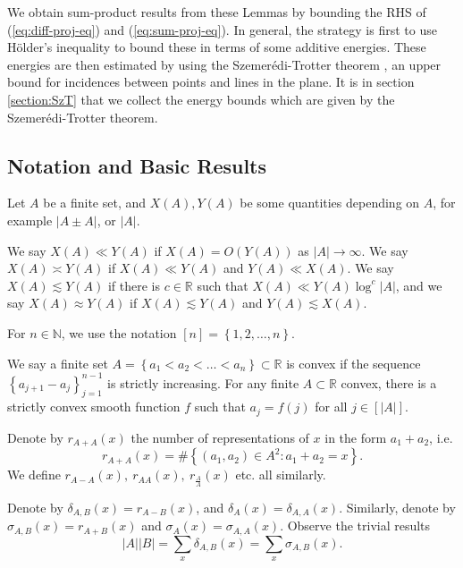 \documentclass[reqno]{amsart}
\newcommand{\szemeredi}{Szemer{\'e}di}
\newcommand{\holder}{H\"older}
\numberwithin{equation}{section}
\begin{document}
We obtain sum-product results from these Lemmas by bounding the RHS of 
(\ref{eq:diff-proj-eq}) and (\ref{eq:sum-proj-eq}). 
In general, the strategy is first to use \holder's inequality to
bound these in terms of some additive energies.
These energies are then estimated by using the \szemeredi-Trotter theorem \cite{SzT-original}, an upper
bound for incidences between points and lines in the plane. It is in section \ref{section:SzT}
that we collect the energy bounds which are given by the \szemeredi-Trotter theorem.

\bigskip

\subsection*{Notation and Basic Results}
Let \(A\) be a finite set, and \(X(A),Y(A)\) be some quantities depending on \(A\), for example \(\left\lvert A\pm A \right\rvert \), or \(\left\lvert A \right\rvert \).

We say \(X(A) \ll Y(A)\) if \(X(A) = O(Y(A))\) as \(\left\lvert A \right\rvert \to \infty  \).
We say \(X(A) \asymp Y(A)\) if \(X(A) \ll Y(A)\) and \(Y(A) \ll X(A)\). We say \(X(A) \lesssim Y(A)\) if
there is \(c \in \mathbb{R} \) such that \(X(A) \ll Y(A) \log ^{c}\left\lvert A \right\rvert \), and we say
\(X(A) \approx Y(A)\) if \(X(A)\lesssim Y(A)\) and \(Y(A) \lesssim X(A)\).

For \(n \in \mathbb{N} \), we use the notation \([n] = \left\{ 1,2, \ldots , n \right\} \).

We say a finite set \(A = \left\{ a_1 < a_2 < \ldots < a_{n}  \right\} \subset \mathbb{R}  \) is convex
if the sequence \(\left\{ a_{j+1} - a_{j}  \right\} _{j=1} ^{n-1}\) is strictly increasing. 
For any finite \(A \subset \mathbb{R} \) convex, there is a strictly convex smooth function \(f\)
such that \(a_{j} = f(j) \) for all \(j \in [\left\lvert A \right\rvert ]\). 

Denote by \(r_{A+A} (x) \)
the number of representations of \(x\) in the form \(a_1 + a_2\), i.e.
\[
    r_{A+A} (x) = \# \left\{ (a_1,a_2)\in A^{2} : a_1 + a_2 = x \right\} 
.\]
We define \(r_{A-A} (x),~ r_{AA} (x),~ r_{\frac{A}{A} } (x)\) etc. all similarly.

Denote by \(\delta_{A,B}(x) = r_{A-B} (x) \), and \(\delta_{A} (x) = \delta_{A,A} (x)\). Similarly, denote by
\(\sigma_{A,B} (x) = r_{A + B} (x)\) and \(\sigma_{A} (x) = \sigma_{A,A} (x)\). Observe the trivial results
\[
    \left\lvert A \right\rvert \left\lvert B \right\rvert = \sum _{x} \delta_{A,B} (x) = \sum _{x}  \sigma_{A,B} (x)
.\]
\end{document}

